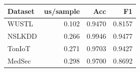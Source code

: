 \begin{tabular}{lrrr}
\toprule
Dataset & us/sample & Acc & F1 \\
\midrule
WUSTL & 0.102 & 0.9470 & 0.8157 \\
NSLKDD & 0.266 & 0.9946 & 0.9477 \\
TonIoT & 0.271 & 0.9703 & 0.9427 \\
MedSec & 0.298 & 0.9700 & 0.8692 \\
\bottomrule
\end{tabular}
